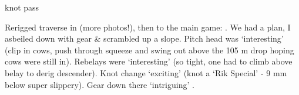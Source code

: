 \begin{marginfigure}
\checkoddpage \ifoddpage \forcerectofloat \else \forceversofloat \fi
\centering
 \caption{\protect{} knot pass }
 \label{paul plopzilla}
\end{marginfigure}


Rerigged traverse in  (more photos!), then to the main game:
. We had a plan, I asbeiled down with gear \& scrambled
up a slope. Pitch head was `interesting' (clip in cows, push through
squeeze and swing out above the 105 m drop hoping cows were still in).
Rebelays were `interesting' (so tight, one had to climb above belay to
derig descender). Knot change `exciting' (knot a `Rik Special' - 9 mm
below super slippery). Gear down there `intriguing'
.

